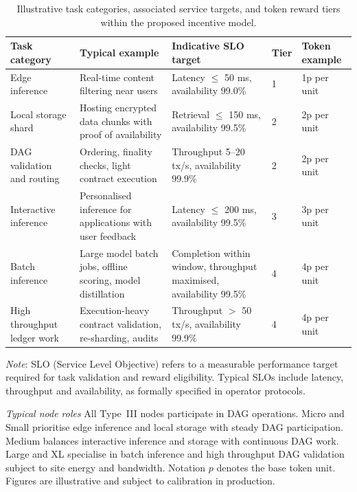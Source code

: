 \documentclass[oneside,10pt]{swissi}
\begin{document}
\begin{table}[h!]
\centering
\small
\renewcommand{\arraystretch}{1.2}
\begin{tabularx}{\textwidth}{p{3.6cm} p{4.6cm} p{4.3cm} X p{2.5cm}}
\hline
\textbf{Task category} & \textbf{Typical example} & \textbf{Indicative SLO target} & \textbf{Tier} & \textbf{Token example} \\
\hline
Edge inference & Real-time content filtering near users & Latency \(\le\) 50 ms, availability 99.0\% & 1 & 1p per unit \\
Local storage shard & Hosting encrypted data chunks with proof of availability & Retrieval \(\le\) 150 ms, availability 99.5\% & 2 & 2p per unit \\
DAG validation and routing & Ordering, finality checks, light contract execution & Throughput 5–20 tx/s, availability 99.9\% & 2 & 2p per unit \\
Interactive inference & Personalised inference for applications with user feedback & Latency \(\le\) 200 ms, availability 99.5\% & 3 & 3p per unit \\
Batch inference & Large model batch jobs, offline scoring, model distillation & Completion within window, throughput maximised, availability 99.5\% & 4 & 4p per unit \\
High throughput ledger work & Execution-heavy contract validation, re-sharding, audits & Throughput \(>\) 50 tx/s, availability 99.9\% & 4 & 4p per unit \\
\hline
\end{tabularx}
\caption{Illustrative task categories, associated service targets, and token reward tiers within the proposed incentive model.}
\label{tab:task-tiers}
\vspace{1ex}
\begin{minipage}{0.94\textwidth}
\small
\textit{Note}: SLO (Service Level Objective) refers to a measurable performance target required for task validation and reward eligibility. Typical SLOs include latency, throughput and availability, as formally specified in operator protocols.
\end{minipage}
\end{table}

\noindent \textit{Typical node roles} All Type~III nodes participate in DAG operations. Micro and Small prioritise edge inference and local storage with steady DAG participation. Medium balances interactive inference and storage with continuous DAG work. Large and XL specialise in batch inference and high throughput DAG validation subject to site energy and bandwidth. Notation \(p\) denotes the base token unit. Figures are illustrative and subject to calibration in production.
\end{document}
